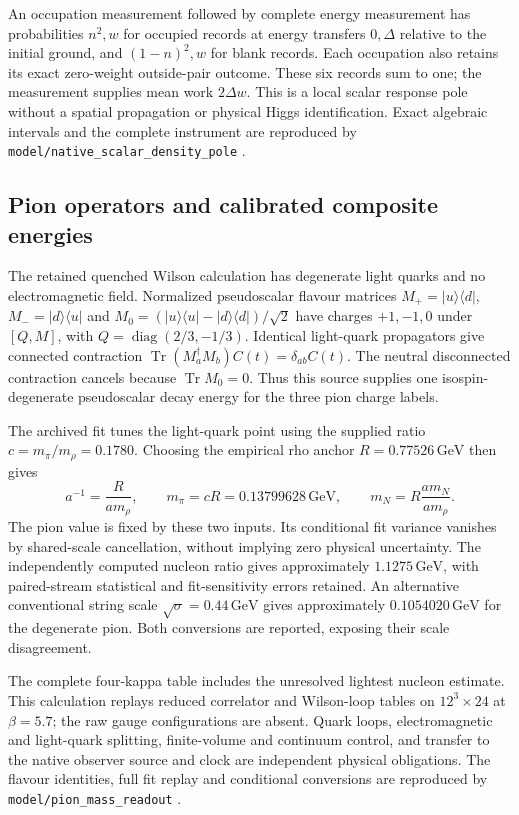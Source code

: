 An occupation measurement followed by complete energy measurement has
probabilities $n^2,w$ for occupied records at energy transfers $0,\Delta$
relative to the initial ground, and
$(1-n)^2,w$ for blank records. Each occupation also retains its exact
zero-weight outside-pair outcome. These six records sum to one; the
measurement supplies mean work $2\Delta w$. This is a local scalar
response pole without a spatial propagation or physical Higgs
identification. Exact algebraic intervals and the complete instrument
are reproduced by \texttt{model/native\_scalar\_density\_pole}
\cite{ophrepo}.

\subsection{Pion operators and calibrated composite energies}

The retained quenched Wilson calculation has degenerate light quarks
and no electromagnetic field. Normalized pseudoscalar flavour
matrices $M_+=|u\rangle\langle d|$,
$M_- = |d\rangle\langle u|$ and
$M_0=(|u\rangle\langle u|-|d\rangle\langle d|)/\sqrt2$
have charges $+1,-1,0$ under $[Q,M]$, with
$Q=\operatorname{diag}(2/3,-1/3)$. Identical light-quark propagators give
connected contraction $\operatorname{Tr}(M_a^\dagger M_b)C(t)
=\delta_{ab}C(t)$. The neutral disconnected contraction cancels because
$\operatorname{Tr}M_0=0$. Thus this source supplies one isospin-degenerate
pseudoscalar decay energy for the three pion charge labels.

The archived fit tunes the light-quark point using the supplied ratio
$c=m_\pi/m_\rho=0.1780$. Choosing the empirical rho anchor
$R=0.77526\,\mathrm{GeV}$ then gives
\[
 a^{-1}=\frac{R}{a m_\rho},\qquad
 m_\pi=cR=0.13799628\,\mathrm{GeV},\qquad
 m_N=R\frac{a m_N}{a m_\rho}.
\]
The pion value is fixed by these two inputs. Its conditional fit variance
vanishes by shared-scale cancellation, without implying zero physical
uncertainty. The independently computed nucleon ratio gives approximately
$1.1275\,\mathrm{GeV}$, with paired-stream statistical and fit-sensitivity
errors retained. An alternative conventional string scale
$\sqrt\sigma=0.44\,\mathrm{GeV}$ gives approximately
$0.1054020\,\mathrm{GeV}$ for the degenerate pion. Both conversions are
reported, exposing their scale disagreement.

The complete four-kappa table includes the unresolved lightest nucleon
estimate. This calculation replays reduced correlator and Wilson-loop
tables on $12^3\times24$ at $\beta=5.7$; the raw gauge configurations
are absent. Quark loops, electromagnetic and light-quark splitting,
finite-volume and continuum control, and transfer to the native observer
source and clock are independent physical obligations. The flavour
identities, full fit replay and conditional conversions are reproduced
by \texttt{model/pion\_mass\_readout} \cite{ophrepo}.

